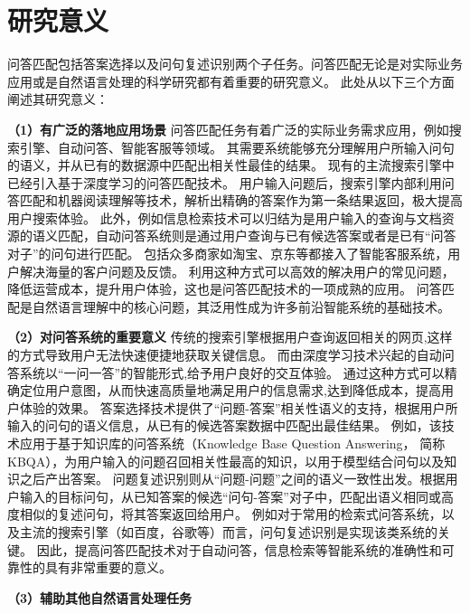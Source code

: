 
\section{研究意义}
问答匹配包括答案选择以及问句复述识别两个子任务。问答匹配无论是对实际业务应用或是自然语言处理的科学研究都有着重要的研究意义。
此处从以下三个方面阐述其研究意义：

\textbf{\songti（1）有广泛的落地应用场景}
问答匹配任务有着广泛的实际业务需求应用，例如搜索引擎、自动问答、智能客服等领域。
其需要系统能够充分理解用户所输入问句的语义，并从已有的数据源中匹配出相关性最佳的结果。
现有的主流搜索引擎中已经引入基于深度学习的问答匹配技术。
用户输入问题后，搜索引擎内部利用问答匹配和机器阅读理解等技术，解析出精确的答案作为第一条结果返回，极大提高用户搜索体验。
此外，例如信息检索技术可以归结为是用户输入的查询与文档资源的语义匹配，自动问答系统则是通过用户查询与已有候选答案或者是已有“问答对子”的问句进行匹配。
包括众多商家如淘宝、京东等都接入了智能客服系统，用户解决海量的客户问题及反馈。
利用这种方式可以高效的解决用户的常见问题，降低运营成本，提升用户体验，这也是问答匹配技术的一项成熟的应用。
问答匹配是自然语言理解中的核心问题，其泛用性成为许多前沿智能系统的基础技术。


\textbf{\songti（2）对问答系统的重要意义}
传统的搜索引擎根据用户查询返回相关的网页,这样的方式导致用户无法快速便捷地获取关键信息。
而由深度学习技术兴起的自动问答系统以“一问一答”的智能形式,给予用户良好的交互体验。
通过这种方式可以精确定位用户意图，从而快速高质量地满足用户的信息需求,达到降低成本，提高用户体验的效果。
答案选择技术提供了“问题-答案”相关性语义的支持，根据用户所输入的问句的语义信息，从已有的候选答案数据中匹配出最佳结果。
例如，该技术应用于基于知识库的问答系统（Knowledge Base Question Answering， 简称KBQA），为用户输入的问题召回相关性最高的知识，以用于模型结合问句以及知识之后产出答案。
问题复述识别则从“问题-问题”之间的语义一致性出发。根据用户输入的目标问句，从已知答案的候选“问句-答案”对子中，匹配出语义相同或高度相似的复述问句，将其答案返回给用户。
例如对于常用的检索式问答系统，以及主流的搜索引擎（如百度，谷歌等）而言，问句复述识别是实现该类系统的关键。
因此，提高问答匹配技术对于自动问答，信息检索等智能系统的准确性和可靠性的具有非常重要的意义。


\textbf{\songti（3）辅助其他自然语言处理任务}

